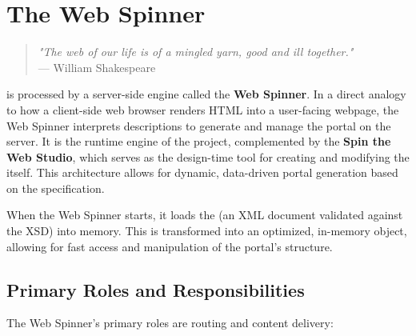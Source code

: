 
\chapter{The Web Spinner}
\label{chap:web-spinner}

\begin{quote}
	\textit{"The web of our life is of a mingled yarn, good and ill together."} \\
— William Shakespeare
\end{quote}

\wbol{} is processed by a server-side engine called the \textbf{Web Spinner}. In a direct analogy to how a client-side web browser renders HTML into a user-facing webpage, the Web Spinner interprets \wbol{} descriptions to generate and manage the portal on the server. It is the runtime engine of the project, complemented by the \textbf{Spin the Web Studio}, which serves as the design-time tool for creating and modifying the \webbase{} itself. This architecture allows for dynamic, data-driven portal generation based on the \wbol{} specification.

When the Web Spinner starts, it loads the \webbase{} (an XML document validated against the \wbol{} XSD) into memory. This \webbase{} is transformed into an optimized, in-memory object, allowing for fast access and manipulation of the portal's structure.

\section{Primary Roles and Responsibilities}
\label{sec:primary-roles}

The Web Spinner's primary roles are routing and content delivery:

